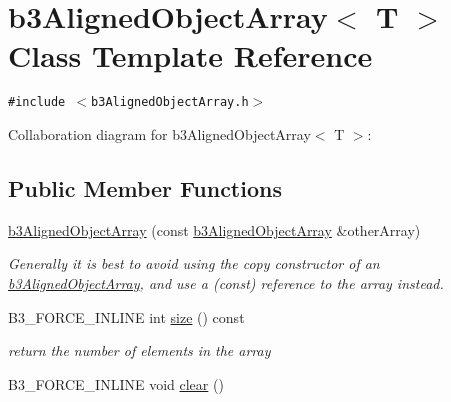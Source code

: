 \hypertarget{classb3_aligned_object_array}{
\section{b3AlignedObjectArray$<$ T $>$ Class Template Reference}
\label{classb3_aligned_object_array}
}
{\tt \#include $<$b3AlignedObjectArray.h$>$}

Collaboration diagram for b3AlignedObjectArray$<$ T $>$:\subsection*{Public Member Functions}
\begin{CompactItemize}
\item 
\hypertarget{classb3_aligned_object_array_e62126efa9fbd38a59fac11b03639086}{
\hyperlink{classb3_aligned_object_array_e62126efa9fbd38a59fac11b03639086}{b3AlignedObjectArray} (const \hyperlink{classb3_aligned_object_array}{b3AlignedObjectArray} \&otherArray)}
\label{classb3_aligned_object_array_e62126efa9fbd38a59fac11b03639086}

\begin{CompactList}\small\item\em Generally it is best to avoid using the copy constructor of an \hyperlink{classb3_aligned_object_array}{b3AlignedObjectArray}, and use a (const) reference to the array instead. \item\end{CompactList}\item 
\hypertarget{classb3_aligned_object_array_18672b9373a0a957d49677195fde6a85}{
B3\_\-FORCE\_\-INLINE int \hyperlink{classb3_aligned_object_array_18672b9373a0a957d49677195fde6a85}{size} () const }
\label{classb3_aligned_object_array_18672b9373a0a957d49677195fde6a85}

\begin{CompactList}\small\item\em return the number of elements in the array \item\end{CompactList}\item 
\hypertarget{classb3_aligned_object_array_cdc54ab1ea43d23576dfcd62ca643995}{
B3\_\-FORCE\_\-INLINE void \hyperlink{classb3_aligned_object_array_cdc54ab1ea43d23576dfcd62ca643995}{clear} ()}
\label{classb3_aligned_object_array_cdc54ab1ea43d23576dfcd62ca643995}


\end{CompactItemize}

